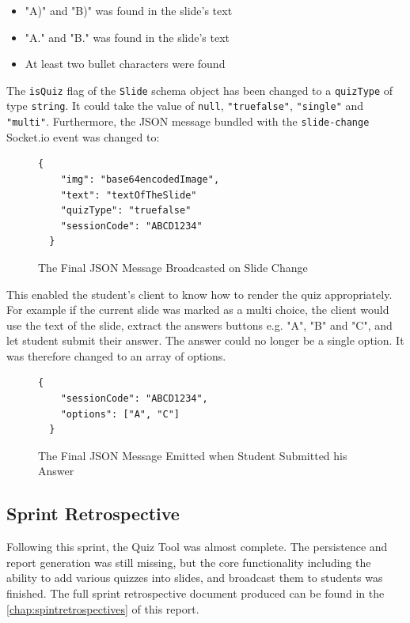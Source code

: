 \begin{itemize}
  \item "A)" and "B)" was found in the slide's text
  \item "A." and "B." was found in the slide's text
  \item At least two bullet characters were found
\end{itemize}

The \texttt{isQuiz} flag of the \texttt{Slide} schema object has been changed to a \texttt{quizType}
of type \texttt{string}. It could take the value of \texttt{null}, \texttt{"truefalse"}, \texttt{"single"}
and \texttt{"multi"}. Furthermore, the JSON message bundled with the \texttt{slide-change} Socket.io
event was changed to:

\begin{figure}[h!]
  \begin{lstlisting}[basicstyle=\small]
  {
    "img": "base64encodedImage",
    "text": "textOfTheSlide"
    "quizType": "truefalse"
    "sessionCode": "ABCD1234"
  }
  \end{lstlisting}
  \caption{The Final JSON Message Broadcasted on Slide Change}
\end{figure}

This enabled the student's client to know how to render the quiz appropriately. For example if
the current slide was marked as a multi choice, the client would use the text of the slide,
extract the answers buttons e.g. "A", "B" and "C", and let student submit their answer.
The answer could no longer be a single option. It was therefore changed to an array of options.

\begin{figure}[h!]
  \begin{lstlisting}[basicstyle=\small]
  {
    "sessionCode": "ABCD1234",
    "options": ["A", "C"]
  }
  \end{lstlisting}
  \caption{The Final JSON Message Emitted when Student Submitted his Answer}
\end{figure}

\subsection{Sprint Retrospective}
Following this sprint, the Quiz Tool was almost complete. The persistence and report
generation was still missing, but the core functionality including the ability
to add various quizzes into slides, and broadcast them to students was finished.
The full sprint retrospective document produced can be found in the
\autoref{chap:spintretrospectives} of this report.

